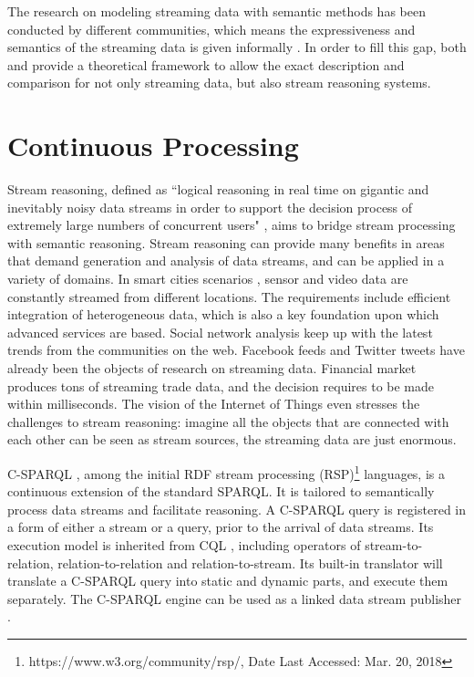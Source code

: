 The research on modeling streaming data with semantic methods has been conducted by different communities, which means the expressiveness and semantics of the streaming data is given informally \cite{della2009s}.
In order to fill this gap, both \cite{beck2015towards} and \cite{beck2015lars} provide a theoretical framework to allow the exact description and comparison for not only streaming data, but also stream reasoning systems.
%
\section{Continuous Processing}
Stream reasoning, defined as ``logical reasoning in real time on gigantic and inevitably noisy data streams in order to support the decision process of extremely large numbers of concurrent users" \cite{stuckenschmidt2010towards}, aims to bridge stream processing with semantic reasoning. 
Stream reasoning can provide many benefits in areas that demand generation and analysis of data streams, and can be applied in a variety of domains.
In smart cities scenarios \cite{tallevi2013real} \cite{lecue2012capturing}, sensor and video data are constantly streamed from different locations.
The requirements include efficient integration of heterogeneous data, which is also a key foundation upon which advanced services are based. 
Social network analysis \cite{barbieri2009continuous} keep up with the latest trends from the communities on the web.
Facebook feeds and Twitter tweets have already been the objects of research on streaming data.
Financial market \cite{stonebraker20058} produces tons of streaming trade data, and the decision requires to be made within milliseconds.
The vision of the Internet of Things \cite{atzori2010internet} even stresses the challenges to stream reasoning: imagine all the objects that are connected with each other can be seen as stream sources, the streaming data are just enormous. 

C-SPARQL \cite{barbieri2009c}, among the initial RDF stream processing (RSP)\footnote{https://www.w3.org/community/rsp/, Date Last Accessed: Mar. 20, 2018} languages, is a continuous extension of the standard SPARQL. 
It is tailored to semantically process data streams and facilitate reasoning. 
A C-SPARQL query is registered in a form of either a stream or a query, prior to the arrival of data streams.
Its execution model is inherited from CQL \cite{arasu2006cql}, including operators of stream-to-relation, relation-to-relation and relation-to-stream. 
Its built-in translator will translate a C-SPARQL query into static and dynamic parts, and execute them separately. 
The C-SPARQL engine can be used as a linked data stream publisher \cite{barbieri2010proposal}. 

